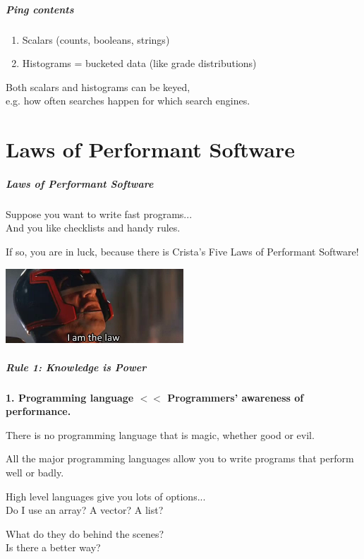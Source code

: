 \begin{frame}
\frametitle{Ping contents}
\Large

\begin{enumerate}
\item Scalars (counts, booleans, strings)
\item Histograms = bucketed data (like grade distributions)
\end{enumerate}

Both scalars and histograms can be keyed, \\
e.g. how often searches happen for which search engines.
\end{frame}

\part{Laws of Performant Software}

\begin{frame}
\partpage
\end{frame}


\begin{frame}
\frametitle{Laws of Performant Software}

Suppose you want to write fast programs...\\
\quad And you like checklists and handy rules. 

If so, you are in luck, because there is Crista's Five Laws of Performant Software!

\begin{center}
	\includegraphics[width=0.5\textwidth]{images/thelaw.png}
\end{center}

\end{frame}



\begin{frame}
\frametitle{Rule 1: Knowledge is Power}

\textbf{1. Programming language $<<$ Programmers' awareness of performance.}

There is no programming language that is magic, whether good or evil. 

All the major programming languages allow you to write programs that perform well or badly. 

High level languages give you lots of options...\\
\quad Do I use an array? A vector? A list? 

What do they do behind the scenes?\\
\quad Is there a better way?

\end{frame}




